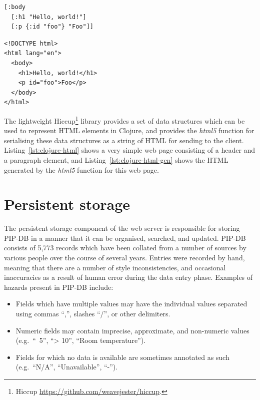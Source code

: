 \lstset{language=clojure}
\begin{lstlisting}[label=lst:clojure-html,caption={%
      [Example Clojure representation of HTML elements]
       Example Clojure representation of HTML elements.}]
[:body
  [:h1 "Hello, world!"]
  [:p {:id "foo"} "Foo"]]
\end{lstlisting}


\lstset{language=html}
\begin{lstlisting}[label=lst:clojure-html-gen,caption={%
      [Generated HTML for the Clojure example]
       The HTML which is generated on evaluation of the Clojure example.}]
<!DOCTYPE html>
<html lang="en">
  <body>
    <h1>Hello, world!</h1>
    <p id="foo">Foo</p>
  </body>
</html>
\end{lstlisting}


The lightweight Hiccup\footnote{Hiccup
  \url{https://github.com/weavejester/hiccup}.}  library provides a
set of data structures which can be used to represent HTML elements in
Clojure, and provides the \textit{html5} function for serialising
these data structures as a string of HTML for sending to the client.
Listing~\ref{lst:clojure-html} shows a very simple web page consisting
of a header and a paragraph element, and
Listing~\ref{lst:clojure-html-gen} shows the HTML generated by the
\textit{html5} function for this web page.

\section{Persistent storage}\label{sec:persistent-storage}

The persistent storage component of the web server is responsible for
storing PIP-DB in a manner that it can be organised, searched, and
updated. PIP-DB consists of 5,773 records which have been collated
from a number of sources by various people over the course of several
years. Entries were recorded by hand, meaning that there are a number
of style inconsistencies, and occasional inaccuracies as a result of
human error during the data entry phase. Examples of hazards present
in PIP-DB include:

\begin{itemize}
\item Fields which have multiple values may have the individual values
  separated using commas ``,'', slashes ``/'', or other delimiters.
\item Numeric fields may contain imprecise, approximate, and
  non-numeric values (e.g.\ ``~5'', ``> 10'', ``Room temperature'').
\item Fields for which no data is available are sometimes annotated as
  such (e.g.\ ``N/A'', ``Unavailable'', ``-'').
\end{itemize}


